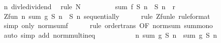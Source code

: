 \begin{isabellebody}
\ n\ div{\isacharunderscore}{\kern0pt}le{\isacharunderscore}{\kern0pt}dividend\ \isamarkupfalse%
\ {\isacharparenleft}{\kern0pt}rule\ N{\isacharparenright}{\kern0pt}\isanewline
\ \ \ \ \ \ \isamarkupfalse%
\ \isamarkupfalse%
\ {\isachardoublequoteopen}sum\ {\isacharquery}{\kern0pt}f\ {\isacharparenleft}{\kern0pt}{\isacharquery}{\kern0pt}S{}\ n\ {\isacharminus}{\kern0pt}\ {\isacharquery}{\kern0pt}S{}\ n{\isacharparenright}{\kern0pt}\ {\isacharless}{\kern0pt}\ r{\isachardoublequoteclose}\ \isacommand{{\isachardot}{\kern0pt}}\isamarkupfalse%
\isanewline
\ \ \ \ \isamarkupfalse%
\isanewline
\ \ \isamarkupfalse%
\isanewline
\ \ \isamarkupfalse%
\ \isamarkupfalse%
\ {\isachardoublequoteopen}Zfun\ {\isacharparenleft}{\kern0pt}{\isasymlambda}n{\isachardot}{\kern0pt}\ sum\ {\isacharquery}{\kern0pt}g\ {\isacharparenleft}{\kern0pt}{\isacharquery}{\kern0pt}S{}\ n\ {\isacharminus}{\kern0pt}\ {\isacharquery}{\kern0pt}S{}\ n{\isacharparenright}{\kern0pt}{\isacharparenright}{\kern0pt}\ sequentially{\isachardoublequoteclose}\isanewline
\ \ \ \ \isamarkupfalse%
\ {\isacharparenleft}{\kern0pt}rule\ Zfun{\isacharunderscore}{\kern0pt}le\ {\isacharbrackleft}{\kern0pt}rule{\isacharunderscore}{\kern0pt}format{\isacharbrackright}{\kern0pt}{\isacharparenright}{\kern0pt}\isanewline
\ \ \ \ \isamarkupfalse%
\ {\isacharparenleft}{\kern0pt}simp\ only{\isacharcolon}{\kern0pt}\ norm{\isacharunderscore}{\kern0pt}sum{\isacharunderscore}{\kern0pt}f{\isacharparenright}{\kern0pt}\isanewline
\ \ \ \ \isamarkupfalse%
\ {\isacharparenleft}{\kern0pt}rule\ order{\isacharunderscore}{\kern0pt}trans\ {\isacharbrackleft}{\kern0pt}OF\ norm{\isacharunderscore}{\kern0pt}sum\ sum{\isacharunderscore}{\kern0pt}mono{\isacharbrackright}{\kern0pt}{\isacharparenright}{\kern0pt}\isanewline
\ \ \ \ \isamarkupfalse%
\ {\isacharparenleft}{\kern0pt}auto\ simp\ add{\isacharcolon}{\kern0pt}\ norm{\isacharunderscore}{\kern0pt}mult{\isacharunderscore}{\kern0pt}ineq{\isacharparenright}{\kern0pt}\isanewline
\ \ \ \ \isamarkupfalse%
\isanewline
\ \ \isamarkupfalse%
\ \isamarkupfalse%
\ {}{\isacharcolon}{\kern0pt}\ {\isachardoublequoteopen}{\isacharparenleft}{\kern0pt}{\isasymlambda}n{\isachardot}{\kern0pt}\ sum\ {\isacharquery}{\kern0pt}g\ {\isacharparenleft}{\kern0pt}{\isacharquery}{\kern0pt}S{}\ n{\isacharparenright}{\kern0pt}\ {\isacharminus}{\kern0pt}\ sum\ {\isacharquery}{\kern0pt}g\ {\isacharparenleft}{\kern0pt}{\isacharquery}{\kern0pt}S{}\ n{\isacharparenright}{\kern0pt}{\isacharparenright}{\kern0pt}\ {\isasymlonglonglongrightarrow}\ {}{\isachardoublequoteclose}\isanewline

\end{isabellebody}
